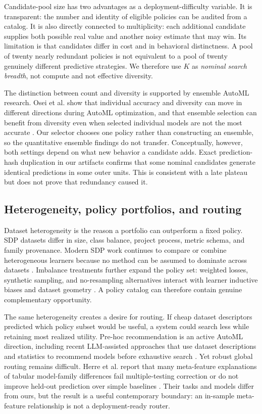\documentclass[referee]{USG}
\begin{document}
Candidate-pool size has two advantages as a deployment-difficulty variable. It is transparent: the number and identity of eligible policies can be audited from a catalog. It is also directly connected to multiplicity: each additional candidate supplies both possible real value and another noisy estimate that may win. Its limitation is that candidates differ in cost and in behavioral distinctness. A pool of twenty nearly redundant policies is not equivalent to a pool of twenty genuinely different predictive strategies. We therefore use $K$ as \emph{nominal search breadth}, not compute and not effective diversity.

The distinction between count and diversity is supported by ensemble AutoML research. Osei et al. show that individual accuracy and diversity can move in different directions during AutoML optimization, and that ensemble selection can benefit from diversity even when selected individual models are not the most accurate \cite{osei2025diversity}. Our selector chooses one policy rather than constructing an ensemble, so the quantitative ensemble findings do not transfer. Conceptually, however, both settings depend on what new behavior a candidate adds. Exact prediction-hash duplication in our artifacts confirms that some nominal candidates generate identical predictions in some outer units. This is consistent with a late plateau but does not prove that redundancy caused it.

\subsection{Heterogeneity, policy portfolios, and routing}
Dataset heterogeneity is the reason a portfolio can outperform a fixed policy. SDP datasets differ in size, class balance, project process, metric schema, and family provenance. Modern SDP work continues to compare or combine heterogeneous learners because no method can be assumed to dominate across datasets \cite{li2025averaging}. Imbalance treatments further expand the policy set: weighted losses, synthetic sampling, and no-resampling alternatives interact with learner inductive biases and dataset geometry \cite{malhotra2026imbalanced,cui2026augmentation}. A policy catalog can therefore contain genuine complementary opportunity.

The same heterogeneity creates a desire for routing. If cheap dataset descriptors predicted which policy subset would be useful, a system could search less while retaining most realized utility. Pre-hoc recommendation is an active AutoML direction, including recent LLM-assisted approaches that use dataset descriptions and statistics to recommend models before exhaustive search \cite{belkhiter2025prehoc}. Yet robust global routing remains difficult. Herre et al. report that many meta-feature explanations of tabular model-family differences fail multiple-testing correction or do not improve held-out prediction over simple baselines \cite{herre2026metafeatures}. Their tasks and models differ from ours, but the result is a useful contemporary boundary: an in-sample meta-feature relationship is not a deployment-ready router.
\end{document}
